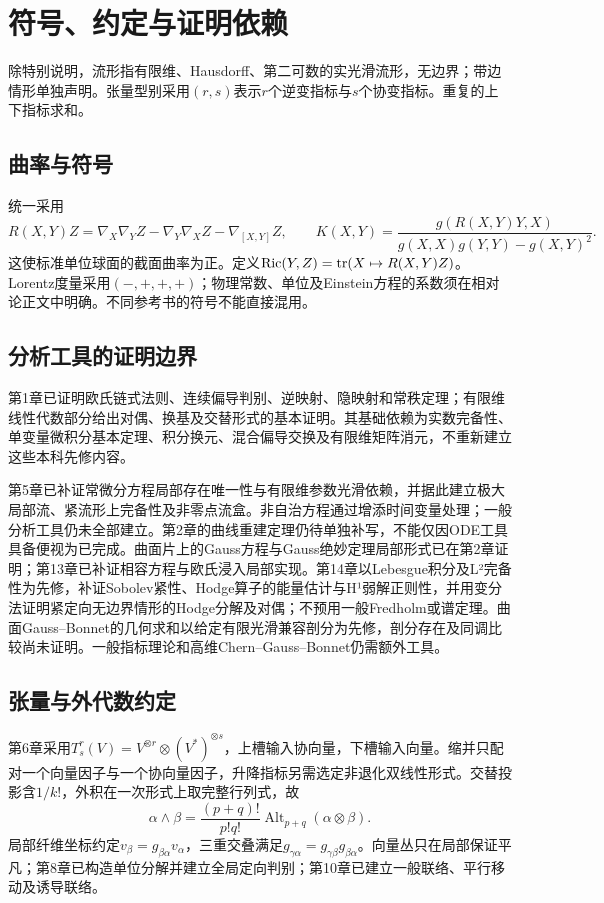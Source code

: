 \chapter{符号、约定与证明依赖}
除特别说明，流形指有限维、Hausdorff、第二可数的实光滑流形，无边界；带边情形单独声明。张量型别采用$(r,s)$表示$r$个逆变指标与$s$个协变指标。重复的上下指标求和。
\section{曲率与符号}
统一采用
\[
R(X,Y)Z=\nabla_X\nabla_YZ-\nabla_Y\nabla_XZ-\nabla_{[X,Y]}Z,
\qquad
K(X,Y)=\frac{g(R(X,Y)Y,X)}{g(X,X)g(Y,Y)-g(X,Y)^2}.
\]
这使标准单位球面的截面曲率为正。定义$\operatorname{Ric}(Y,Z)=\operatorname{tr}(X\mapsto R(X,Y)Z)$。Lorentz度量采用$(-,+,+,+)$；物理常数、单位及Einstein方程的系数须在相对论正文中明确。不同参考书的符号不能直接混用。
\section{分析工具的证明边界}
第1章已证明欧氏链式法则、连续偏导判别、逆映射、隐映射和常秩定理；有限维线性代数部分给出对偶、换基及交替形式的基本证明。其基础依赖为实数完备性、单变量微积分基本定理、积分换元、混合偏导交换及有限维矩阵消元，不重新建立这些本科先修内容。

第5章已补证常微分方程局部存在唯一性与有限维参数光滑依赖，并据此建立极大局部流、紧流形上完备性及非零点流盒。非自治方程通过增添时间变量处理；一般分析工具仍未全部建立。第2章的曲线重建定理仍待单独补写，不能仅因ODE工具具备便视为已完成。曲面片上的Gauss方程与Gauss绝妙定理局部形式已在第2章证明；第13章已补证相容方程与欧氏浸入局部实现。第14章以Lebesgue积分及L²完备性为先修，补证Sobolev紧性、Hodge算子的能量估计与H¹弱解正则性，并用变分法证明紧定向无边界情形的Hodge分解及对偶；不预用一般Fredholm或谱定理。曲面Gauss--Bonnet的几何求和以给定有限光滑兼容剖分为先修，剖分存在及同调比较尚未证明。一般指标理论和高维Chern--Gauss--Bonnet仍需额外工具。

\section{张量与外代数约定}
第6章采用$T^r_s(V)=V^{\otimes r}\otimes(V^*)^{\otimes s}$，上槽输入协向量，下槽输入向量。缩并只配对一个向量因子与一个协向量因子，升降指标另需选定非退化双线性形式。交替投影含$1/k!$，外积在一次形式上取完整行列式，故
\[
 \alpha\wedge\beta=\frac{(p+q)!}{p!q!}\operatorname{Alt}_{p+q}(\alpha\otimes\beta).
\]
局部纤维坐标约定$v_\beta=g_{\beta\alpha}v_\alpha$，三重交叠满足$g_{\gamma\alpha}=g_{\gamma\beta}g_{\beta\alpha}$。向量丛只在局部保证平凡；第8章已构造单位分解并建立全局定向判别；第10章已建立一般联络、平行移动及诱导联络。

